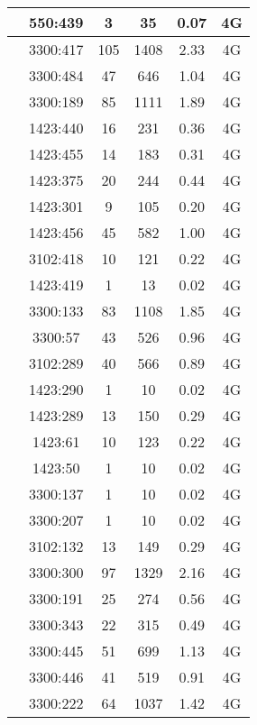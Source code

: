 \begin{longtable*}{|c|c|c|c|c|c|}
 &550:439&3&35&0.07&4G\\\hline
{} &3300:417&105&1408&2.33&4G\\\hline
{} &3300:484&47&646&1.04&4G\\\hline
{} &3300:189&85&1111&1.89&4G\\\hline
{} &1423:440&16&231&0.36&4G\\\hline
{} &1423:455&14&183&0.31&4G\\\hline
{} &1423:375&20&244&0.44&4G\\\hline
{} &1423:301&9&105&0.20&4G\\\hline
{} &1423:456&45&582&1.00&4G\\\hline
{} &3102:418&10&121&0.22&4G\\\hline
{} &1423:419&1&13&0.02&4G\\\hline
{} &3300:133&83&1108&1.85&4G\\\hline
{} &3300:57&43&526&0.96&4G\\\hline
{} &3102:289&40&566&0.89&4G\\\hline
{} &1423:290&1&10&0.02&4G\\\hline
{} &1423:289&13&150&0.29&4G\\\hline
{} &1423:61&10&123&0.22&4G\\\hline
{} &1423:50&1&10&0.02&4G\\\hline
{} &3300:137&1&10&0.02&4G\\\hline
{} &3300:207&1&10&0.02&4G\\\hline
{} &3102:132&13&149&0.29&4G\\\hline
{} &3300:300&97&1329&2.16&4G\\\hline
{} &3300:191&25&274&0.56&4G\\\hline
{} &3300:343&22&315&0.49&4G\\\hline
{} &3300:445&51&699&1.13&4G\\\hline
{} &3300:446&41&519&0.91&4G\\\hline
{} &3300:222&64&1037&1.42&4G\\\hline

\end{longtable*}
